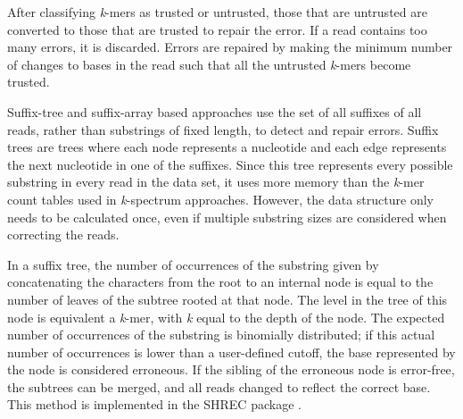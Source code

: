 
After classifying \textit{k}-mers as trusted or untrusted, those that are untrusted are converted to those that are trusted to repair the error. If a read contains too many errors, it is discarded. Errors are repaired by making the minimum number of changes to bases in the read such that all the untrusted \textit{k}-mers become trusted.

Suffix-tree and suffix-array based approaches use the set of all suffixes of all reads, rather than substrings of fixed length, to detect and repair errors. Suffix trees are trees where each node represents a nucleotide and each edge represents the next nucleotide in one of the suffixes. Since this tree represents every possible substring in every read in the data set, it uses more memory than the \textit{k}-mer count tables used in \textit{k}-spectrum approaches. However, the data structure only needs to be calculated once, even if multiple substring sizes are considered when correcting the reads.

In a suffix tree, the number of occurrences of the substring given by concatenating the characters from the root to an internal node is equal to the number of leaves of the subtree rooted at that node. The level in the tree of this node is equivalent a \textit{k}-mer, with \textit{k} equal to the depth of the node. The expected number of occurrences of the substring is binomially distributed; if this actual number of occurrences is lower than a user-defined cutoff, the base represented by the node is considered erroneous. If the sibling of the erroneous node is error-free, the subtrees can be merged, and all reads changed to reflect the correct base. This method is implemented in the SHREC package \parencite{schroder_shrec:_2009}.

